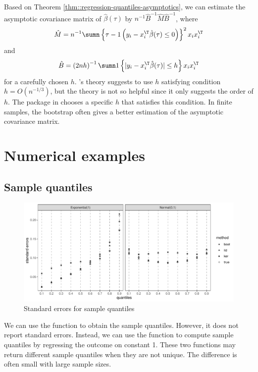Based on Theorem \ref{thm::regression-quantiles-asymptotics}, we can estimate the asymptotic covariance matrix of $\hat{\beta}(\tau)$ by $n^{-1} \hat{B}^{-1} \hat{M}  \hat{B}^{-1}$, where
\[
\hat{M}=n^{-1}\sumn\left\{ \tau-1\left(y_{i}-x_{i}^{\T}\hat{\beta}(\tau)\leq0\right)\right\} ^{2}x_{i}x_{i}^{\T}
\]
and
\[
\hat{B}=\left(2nh\right)^{-1}\sumn1\left\{ |y_{i}-x_{i}^{\T}\hat{\beta}(\tau)|\leq h\right\} x_{i}x_{i}^{\T}
\]
for a carefully chosen $h$. \citet{powell1991estimation}'s theory suggests to use $h$ satisfying condition $h=O(n^{-1/3})$, but the theory is not so helpful since it only suggests the order of $h$. The  package in  chooses a specific $h$ that satisfies this condition. 
In finite samples, the bootstrap often gives a better estimation of the asymptotic covariance matrix. 



\section{Numerical examples}\label{section::numerical-examples-qr}

\subsection{Sample quantiles}


\begin{figure}[ht]
\centering
\includegraphics[width = \textwidth]{figures/ese_quantiles.pdf}
\caption{Standard errors for sample quantiles}\label{fig::se-sample-quantiles}
\end{figure}



We can use the  function to obtain the sample quantiles. However, it does not report standard errors. Instead, we can use the  function to compute sample quantiles by regressing the outcome on constant 1. These two functions may return different sample quantiles when they are not unique. The difference is often small with large sample sizes. 


